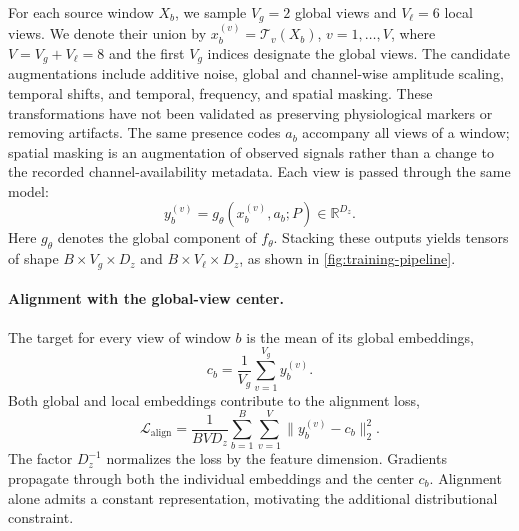 \documentclass{article}
\begin{document}
For each source window $X_b$, we sample $V_g=2$ global views
and $V_\ell=6$ local views. We denote their union by
$x_b^{(v)}=\mathcal{T}_v(X_b)$, $v=1,\ldots,V$, where $V=V_g+V_\ell=8$ and
the first $V_g$ indices designate the global views.
The candidate augmentations include additive noise, global and
channel-wise amplitude scaling, temporal shifts, and temporal, frequency,
and spatial masking. These transformations have not been validated as preserving physiological
markers or removing artifacts. The same presence codes $a_b$ accompany
all views of a window; spatial masking is an augmentation of observed
signals rather than a change to the recorded channel-availability metadata. Each view is passed through the same model:
\begin{equation}
    y_b^{(v)}=g_\theta(x_b^{(v)},a_b;P)
      \in\mathbb{R}^{D_z}.
\end{equation}
Here $g_\theta$ denotes the global component of $f_\theta$.
Stacking these outputs yields tensors of shape $B\times V_g\times D_z$
and $B\times V_\ell\times D_z$, as shown in \cref{fig:training-pipeline}.

\paragraph{Alignment with the global-view center.}
The target for every view of window $b$ is the mean of its global embeddings,
\begin{equation}
    c_b=\frac{1}{V_g}\sum_{v=1}^{V_g}y_b^{(v)}.
    \label{eq:global-center}
\end{equation}
Both global and local embeddings contribute to the alignment loss,
\begin{equation}
    \mathcal{L}_{\mathrm{align}}
      =\frac{1}{BVD_z}\sum_{b=1}^{B}\sum_{v=1}^{V}
         \|y_b^{(v)}-c_b\|_2^2.
    \label{eq:alignment}
\end{equation}
The factor $D_z^{-1}$ normalizes the loss by the feature dimension.
Gradients propagate through both the individual embeddings and the center
$c_b$. Alignment alone admits a constant representation, motivating the
additional distributional constraint.
\end{document}

